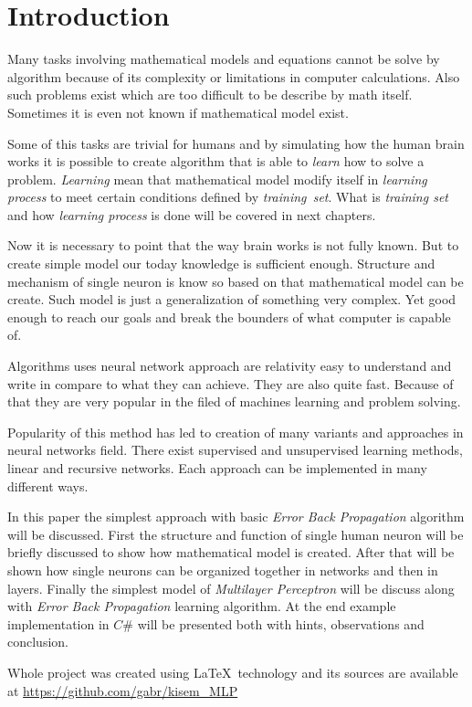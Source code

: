 \section{Introduction}
Many tasks involving mathematical models and equations cannot be solve by algorithm because of its complexity or limitations in computer calculations. Also such problems exist which are too difficult to be describe by math itself. Sometimes it is even not known if mathematical model exist.

Some of this tasks are trivial for humans and by simulating how the human brain works it is possible to create algorithm that is able to \textit{learn} how to solve a problem. \textit{Learning} mean that mathematical model modify itself in \textit{learning process} to meet certain conditions defined by \textit{training~set}. What is \textit{training set} and how \textit{learning process} is done will be covered in next chapters.

Now it is necessary to point that the way brain works is not fully known. But to create simple model our today knowledge is sufficient enough. Structure and mechanism of single neuron is know so based on that mathematical model can be create. Such model is just a generalization of something very complex. Yet good enough to reach our goals and break the bounders of what computer is capable of.

Algorithms uses neural network approach are relativity easy to understand and write in compare to what they can achieve. They are also quite fast. Because of that they are very popular in the filed of machines learning and problem solving.

Popularity of this method has led to creation of many variants and approaches in neural networks field. There exist supervised and unsupervised learning methods, linear and recursive networks. Each approach can be implemented in many different ways.

In this paper the simplest approach with basic \textit{Error Back Propagation} algorithm will be discussed. First the structure and function of single human neuron will be briefly discussed to show how mathematical model is created. After that will be shown how single neurons can be organized together in networks and then in layers. Finally the simplest model of \textit{Multilayer Perceptron} will be discuss along with \textit{Error Back Propagation} learning algorithm. At the end example implementation in $ C\# $ will be presented both with hints, observations and conclusion.

\begin{bottompar}
Whole project was created using \LaTeX \ technology and its sources are available at \url{https://github.com/gabr/kisem_MLP}

\ 
\end{bottompar}